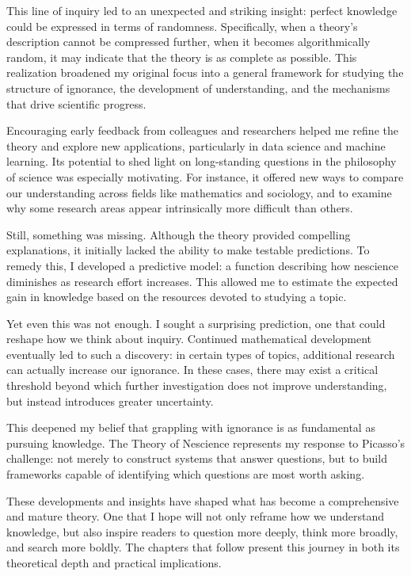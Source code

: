 This line of inquiry led to an unexpected and striking insight: perfect knowledge could be expressed in terms of randomness. Specifically, when a theory's description cannot be compressed further, when it becomes algorithmically random, it may indicate that the theory is as complete as possible. This realization broadened my original focus into a general framework for studying the structure of ignorance, the development of understanding, and the mechanisms that drive scientific progress.

Encouraging early feedback from colleagues and researchers helped me refine the theory and explore new applications, particularly in data science and machine learning. Its potential to shed light on long-standing questions in the philosophy of science was especially motivating. For instance, it offered new ways to compare our understanding across fields like mathematics and sociology, and to examine why some research areas appear intrinsically more difficult than others.

Still, something was missing. Although the theory provided compelling explanations, it initially lacked the ability to make testable predictions. To remedy this, I developed a predictive model: a function describing how nescience diminishes as research effort increases. This allowed me to estimate the expected gain in knowledge based on the resources devoted to studying a topic.

Yet even this was not enough. I sought a surprising prediction, one that could reshape how we think about inquiry. Continued mathematical development eventually led to such a discovery: in certain types of topics, additional research can actually increase our ignorance. In these cases, there may exist a critical threshold beyond which further investigation does not improve understanding, but instead introduces greater uncertainty.

This deepened my belief that grappling with ignorance is as fundamental as pursuing knowledge. The Theory of Nescience represents my response to Picasso's challenge: not merely to construct systems that answer questions, but to build frameworks capable of identifying which questions are most worth asking.

These developments and insights have shaped what has become a comprehensive and mature theory. One that I hope will not only reframe how we understand knowledge, but also inspire readers to question more deeply, think more broadly, and search more boldly. The chapters that follow present this journey in both its theoretical depth and practical implications.

